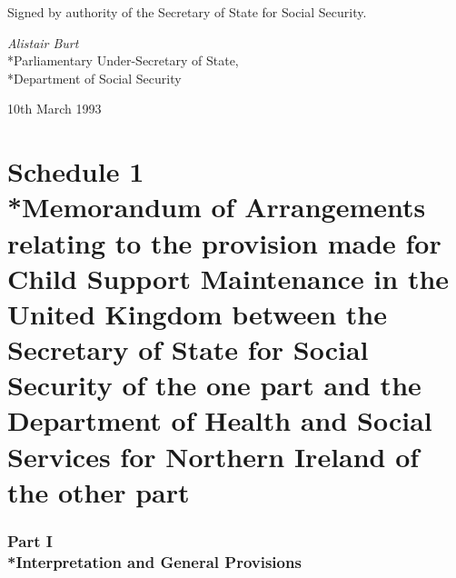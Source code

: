 \documentclass[12pt,a4paper]{article}
\begin{document}
\bigskip

Signed by authority of the Secretary of State for Social Security.

{\raggedleft
\emph{Alistair Burt}\\*Parliamentary Under-Secretary of State,\\*Department of Social Security

}

10th March 1993

\vfill

\small

\part[Schedule 1 --- Memorandum of Arrangements relating to the provision made for Child Support Maintenance in the United Kingdom between the Secretary of State for Social Security of the one part and the Department of Health and Social Services for Northern Ireland of the other part]{Schedule 1\\*Memorandum of Arrangements relating to the provision made for Child Support Maintenance in the United Kingdom between the Secretary of State for Social Security of the one part and the Department of Health and Social Services for Northern Ireland of the other part}

\section[Part I --- Interpretation and General Provisions]{Part I\\*Interpretation and General Provisions}

\renewcommand\parthead{--- Schedule 1 Part I}
\end{document}
